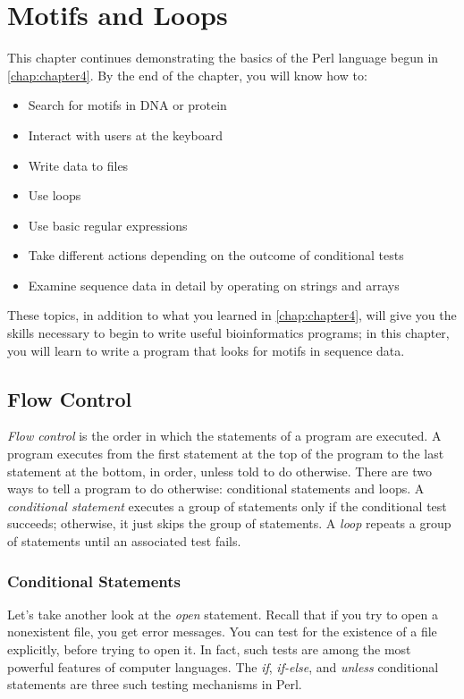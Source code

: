 \chapter{Motifs and Loops}
\label{chap:chapter5}
\minitoc

This chapter continues demonstrating the basics of the Perl language begun in \autoref{chap:chapter4}. By the end of the chapter, you will know how to:

\begin{itemize}
  \item Search for motifs in DNA or protein
  \item Interact with users at the keyboard
  \item Write data to files
  \item Use loops
  \item Use basic regular expressions
  \item Take different actions depending on the outcome of conditional tests
  \item Examine sequence data in detail by operating on strings and arrays
\end{itemize}

These topics, in addition to what you learned in \autoref{chap:chapter4}, will give you the skills necessary to begin to write useful bioinformatics programs; in this chapter, you will learn to write a program that looks for motifs in sequence data. 

\section{Flow Control}
\textit{Flow control} is the order in which the statements of a program are executed. A program executes from the first statement at the top of the program to the last statement at the bottom, in order, unless told to do otherwise. There are two ways to tell a program to do otherwise: conditional statements and loops. A \textit{conditional statement} executes a group of statements only if the conditional test succeeds; otherwise, it just skips the group of statements. A \textit{loop} repeats a group of statements until an associated test fails.

\subsection{Conditional Statements}
Let's take another look at the \textit{open} statement. Recall that if you try to open a nonexistent file, you get error messages. You can test for the existence of a file explicitly, before trying to open it. In fact, such tests are among the most powerful features of computer languages. The \textit{if}, \textit{if-else}, and \textit{unless} conditional statements are three such testing mechanisms in Perl.

